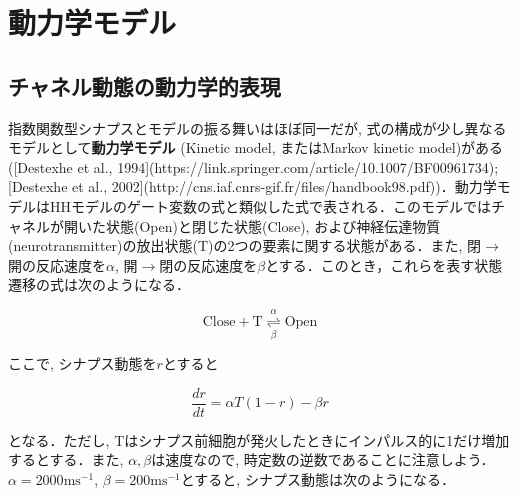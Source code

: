 \section{動力学モデル}
\subsection{チャネル動態の動力学的表現}
指数関数型シナプスとモデルの振る舞いはほぼ同一だが, 式の構成が少し異なるモデルとして\textbf{動力学モデル} (Kinetic model, またはMarkov kinetic model)がある ([Destexhe et al., 1994](https://link.springer.com/article/10.1007/BF00961734); [Destexhe et al., 2002](http://cns.iaf.cnrs-gif.fr/files/handbook98.pdf))．動力学モデルはHHモデルのゲート変数の式と類似した式で表される．このモデルではチャネルが開いた状態(Open)と閉じた状態(Close), および神経伝達物質(neurotransmitter)の放出状態(T)の2つの要素に関する状態がある．また, 閉$\to$開の反応速度を$\alpha$, 開$\to$閉の反応速度を$\beta$とする．このとき，これらを表す状態遷移の式は次のようになる．


\begin{equation}
\text{Close}+\text{T}  \underset{\beta}{\overset{\alpha}{\rightleftharpoons}}\text{Open}    
\end{equation}


ここで, シナプス動態を$r$とすると


\begin{equation}
\frac{dr}{dt}=\alpha T (1-r) - \beta r
\end{equation}


となる．ただし, Tはシナプス前細胞が発火したときにインパルス的に1だけ増加するとする．また, $\alpha, \beta$は速度なので, 時定数の逆数であることに注意しよう． $\alpha=2000 \text{ms}^{-1}$, $\beta=200 \text{ms}^{-1}$とすると, シナプス動態は次のようになる．
